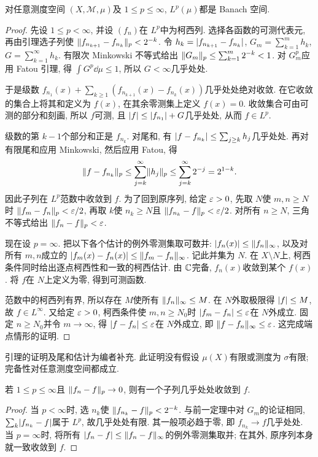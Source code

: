 \begin{theorem}\label{ra:c5:riesz-fischer}
对任意测度空间 $(X,\mathcal M,\mu)$及 $1\le p\le\infty$, $L^p(\mu)$都是 Banach 空间.
\end{theorem}
\begin{proof}
先设 $1\le p<\infty$, 并设 $(f_n)$在 $L^p$中为柯西列. 选择各函数的可测代表元, 再由引理选子列使 $\lVert f_{n_{k+1}}-f_{n_k}\rVert_p<2^{-k}$. 令 $h_k=\lvert f_{n_{k+1}}-f_{n_k}\rvert$, $G_m=\sum_{k=1}^m h_k$, $G=\sum_{k=1}^\infty h_k$. 有限次 Minkowski 不等式给出 $\lVert G_m\rVert_p\le\sum_{k=1}^m2^{-k}<1$. 对 $G_m^p$应用 Fatou 引理, 得 $\int G^p\dd\mu\le1$, 所以 $G<\infty$几乎处处.

于是级数 $f_{n_1}(x)+\sum_{k\ge1}(f_{n_{k+1}}(x)-f_{n_k}(x))$几乎处处绝对收敛. 在它收敛的集合上将其和定义为 $f(x)$, 在其余零测集上定义 $f(x)=0$. 收敛集合可由可测的部分和刻画, 所以 $f$可测, 且 $\lvert f\rvert\le\lvert f_{n_1}\rvert+G$几乎处处, 从而 $f\in L^p$.

级数的第 $k-1$个部分和正是 $f_{n_k}$. 对尾和, 有 $\lvert f-f_{n_k}\rvert\le\sum_{j\ge k}h_j$几乎处处. 再对有限尾和应用 Minkowski, 然后应用 Fatou, 得
\[
 \lVert f-f_{n_k}\rVert_p
 \le\sum_{j=k}^\infty\lVert h_j\rVert_p
 \le\sum_{j=k}^\infty2^{-j}=2^{1-k}.
\]
因此子列在 $L^p$范数中收敛到 $f$. 为了回到原序列, 给定 $\varepsilon>0$, 先取 $N$使 $m,n\ge N$时 $\lVert f_m-f_n\rVert_p<\varepsilon/2$, 再取 $k$使 $n_k\ge N$且 $\lVert f_{n_k}-f\rVert_p<\varepsilon/2$. 对所有 $n\ge N$, 三角不等式给出 $\lVert f_n-f\rVert_p<\varepsilon$.

现在设 $p=\infty$. 把以下各个估计的例外零测集取可数并: $\lvert f_n(x)\rvert\le\lVert f_n\rVert_\infty$, 以及对所有 $m,n$成立的 $\lvert f_m(x)-f_n(x)\rvert\le\lVert f_m-f_n\rVert_\infty$. 记此并集为 $N$. 在 $X\setminus N$上, 柯西条件同时给出逐点柯西性和一致的柯西估计. 由 $\mathbb C$完备, $f_n(x)$收敛到某个 $f(x)$. 将 $f$在 $N$上定义为零, 得到可测函数.

范数中的柯西列有界, 所以存在 $M$使所有 $\lVert f_n\rVert_\infty\le M$. 在 $N$外取极限得 $\lvert f\rvert\le M$, 故 $f\in L^\infty$. 又给定 $\varepsilon>0$, 柯西条件使 $m,n\ge N_0$时 $\lvert f_m-f_n\rvert\le\varepsilon$在 $N$外成立. 固定 $n\ge N_0$并令 $m\to\infty$, 得 $\lvert f-f_n\rvert\le\varepsilon$在 $N$外成立, 即 $\lVert f-f_n\rVert_\infty\le\varepsilon$. 这完成端点情形的证明.
\end{proof}

\begin{remark}
引理的证明及尾和估计为编者补充. 此证明没有假设 $\mu(X)$有限或测度为 $\sigma$有限; 完备性对任意测度空间都成立.
\end{remark}

\begin{corollary}\label{ra:c5:lp-ae-subsequence}
若 $1\le p\le\infty$且 $\lVert f_n-f\rVert_p\to0$, 则有一个子列几乎处处收敛到 $f$.
\end{corollary}
\begin{proof}
当 $p<\infty$时, 选 $n_k$使 $\lVert f_{n_k}-f\rVert_p<2^{-k}$. 与前一定理中对 $G_m$的论证相同, $\sum_k\lvert f_{n_k}-f\rvert$属于 $L^p$, 故几乎处处有限. 其一般项必趋于零, 即 $f_{n_k}\to f$几乎处处. 当 $p=\infty$时, 将所有 $\lvert f_n-f\rvert\le\lVert f_n-f\rVert_\infty$的例外零测集取并; 在其外, 原序列本身就一致收敛到 $f$.
\end{proof}

